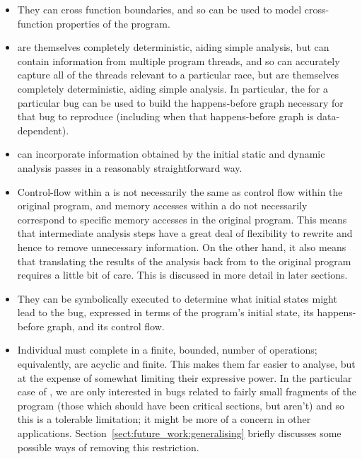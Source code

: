 \begin{itemize}
\item
  They can cross function boundaries, and so can be used to model
  cross-function properties of the program.
\item
  {\STateMachines} are themselves completely deterministic, aiding
  simple analysis, but can contain information from multiple program
  threads, and so can accurately capture all of the threads relevant
  to a particular race, but are themselves completely deterministic,
  aiding simple analysis.  In particular, the {\StateMachine} for a
  particular bug can be used to build the happens-before graph
  necessary for that bug to reproduce (including when that
  happens-before graph is data-dependent).
\item
  {\STateMachines} can incorporate information obtained by the initial
  static and dynamic analysis passes in a reasonably straightforward
  way.
\item
  Control-flow within a {\StateMachine} is not necessarily the same as
  control flow within the original program, and memory accesses within
  a {\StateMachine} do not necessarily correspond to specific memory
  accesses in the original program.  This means that intermediate
  analysis steps have a great deal of flexibility to rewrite
  {\StateMachines} and hence to remove unnecessary information.  On
  the other hand, it also means that translating the results of the
  analysis back from {\StateMachines} to the original program requires
  a little bit of care.  This is discussed in more detail in later
  sections.
\item
  They can be symbolically executed to determine what initial states
  might lead to the bug, expressed in terms of the program's initial
  state, its happens-before graph, and its control flow.
\item
  Individual {\StateMachines} must complete in a finite, bounded,
  number of operations; equivalently, {\StateMachines} are acyclic and
  finite.  This makes them far easier to analyse, but at the expense
  of somewhat limiting their expressive power.  In the particular case
  of {\technique}, we are only interested in bugs related to fairly
  small fragments of the program (those which should have been
  critical sections, but aren't) and so this is a tolerable
  limitation; it might be more of a concern in other applications.
  Section~\ref{sect:future_work:generalising} briefly discusses some
  possible ways of removing this restriction.
\end{itemize}

